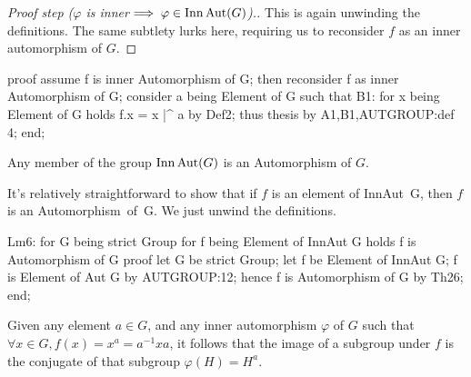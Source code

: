 \begin{proof}[Proof step ($\varphi$ is inner$\implies\varphi\in\operatorname{Inn}\operatorname{Aut}(G)$).]
This is again unwinding the definitions. The same subtlety lurks here,
requiring us to reconsider $f$ as an inner automorphism of $G$.
\end{proof}

\nwenddocs{}\endmoddef\nwstartdeflinemarkup{}\nwenddeflinemarkup
proof
  assume f is inner Automorphism of G;
  then reconsider f as inner Automorphism of G;
  consider a being Element of G such that
  B1: for x being Element of G holds f.x = x |^ a
  by Def2;
  thus thesis by A1,B1,AUTGROUP:def 4;
end;
\nwendcode{}\nwdocspar

\begin{lemma}
Any member of the group $\operatorname{Inn}\operatorname{Aut}(G)$ is an Automorphism of $G$.
\end{lemma}

It's relatively straightforward to show that if $f$ is an element of
{\Tt{}InnAut\ G\nwendquote}, then $f$ is an {\Tt{}Automorphism\ of\ G\nwendquote}. We just unwind the
definitions.

\nwenddocs{}\endmoddef\nwstartdeflinemarkup{}\nwenddeflinemarkup
Lm6:
  for G being strict Group
  for f being Element of InnAut G
  holds f is Automorphism of G
proof
  let G be strict Group;
  let f be Element of InnAut G;
  f is Element of Aut G by AUTGROUP:12;
  hence f is Automorphism of G by Th26;
end;
\eatline
{}\nwendcode{}\nwdocspar
\begin{theorem}\label{thm:characteristic:inner:image-of-inner-automorphism-on-subgroup}
Given any element $a\in G$, and any inner automorphism $\varphi$ of $G$ such
that $\forall x\in G, f(x) = x^{a} = a^{-1}xa$, it follows that the
image of a subgroup under $f$ is the conjugate of that subgroup
$\varphi(H) = H^{a}$.
\end{theorem}

